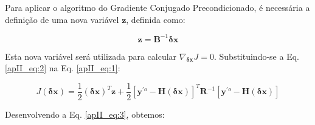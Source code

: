 Para aplicar o algoritmo do Gradiente Conjugado Precondicionado, é necessária a definição de uma nova variável $\mathbf{z}$, definida como:

\begin{equation}
\label{apII_eq:2}
\mathbf{z} = \mathbf{B}^{-1}\mathbf{\delta{x}}
\end{equation}

Esta nova variável será utilizada para calcular $\nabla_{\mathbf{\delta{x}}}J=0$. Substituindo-se a Eq. \ref{apII_eq:2} na Eq. \ref{apII_eq:1}:

\begin{equation}
\label{apII_eq:3}
  J(\mathbf{\delta{x}}) = \frac{1}{2}(\mathbf{\delta{x}})^{T}\mathbf{z} + \frac{1}{2}[\mathbf{y}^{\prime{o}} - \mathbf{H}(\mathbf{\delta{x}})]^{T}\mathbf{R}^{-1}[\mathbf{y}^{\prime{o}} - \mathbf{H}(\mathbf{\delta{x}})]
\end{equation}

Desenvolvendo a Eq. \ref{apII_eq:3}, obtemos:




